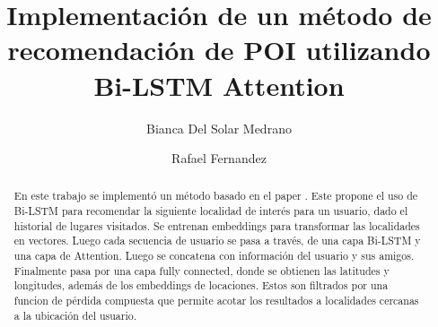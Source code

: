 \documentclass[sigplan,screen]{acmart}
\begin{document}
\title{Implementación de un método de recomendación de POI utilizando Bi-LSTM Attention}

\author{Bianca Del Solar Medrano}

\author{Rafael Fernandez}

\begin{abstract}
En este trabajo se implementó un método basado en el paper \cite{wang2021poi}. Este propone el uso de Bi-LSTM para recomendar la siguiente localidad de interés para un usuario, dado el historial de lugares visitados. Se entrenan embeddings para transformar las localidades en vectores. Luego cada secuencia de usuario se pasa a través, de una capa Bi-LSTM y una capa de Attention. Luego se concatena con información del usuario y sus amigos. Finalmente pasa por una capa fully connected, donde se obtienen  las latitudes y longitudes, además de los embeddings de locaciones. Estos son filtrados por una funcion de pérdida compuesta que permite acotar los resultados a localidades cercanas a la ubicación del usuario.
\end{abstract}


\maketitle
\end{document}
